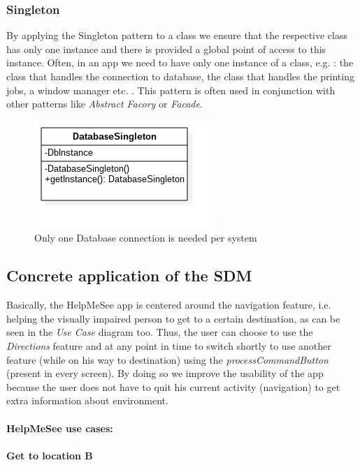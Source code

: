 \documentclass{article}[11]
\begin{document}
	\subsubsection{Singleton}
	By applying the Singleton pattern to a class we ensure that the respective class has only one instance and there is provided a global point of access to this instance. Often, in an app we need to have only one instance of a class, e.g. : the class that handles the connection to database, the class that handles the printing jobs, a window manager etc. . This pattern is often used in conjunction with other patterns like \emph{Abstract Facory} or \emph{Facade}.
	\begin{figure}[H]
		\centering
		\includegraphics[scale=0.9]{./imgs/Singleton}
		\caption{Only one Database connection is needed per system}
	\end{figure}

\subsection{Concrete application of the SDM}
	Basically, the HelpMeSee app is centered around the navigation feature, i.e. helping the visually impaired person to get to  a certain destination, as can be seen in the \emph{Use Case} diagram too. Thus, the user can choose to use the \emph{Directions} feature and at any point in time to switch shortly to use another feature (while on his way to destination) using the \emph{processCommandButton} (present in every screen). By doing so we improve the usability of the app because the user does not have to quit his current activity (navigation) to get extra information about environment.

	\paragraph{HelpMeSee use cases:\\}
	
	
	\paragraph{Get to location B\\}
	
\end{document}
